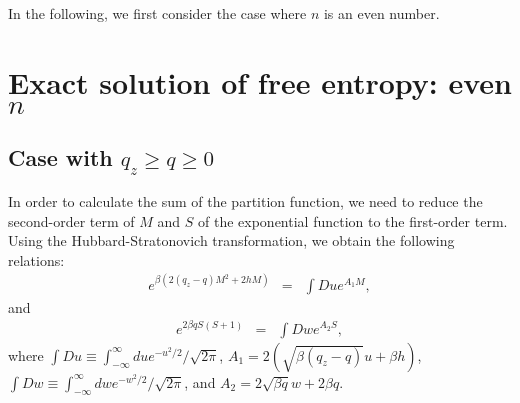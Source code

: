 \documentclass[
aps,
pre,
showpacs
]{revtex4-1}
\newcommand{\be}{\begin{eqnarray}}
\newcommand{\ee}{\end{eqnarray}}
\begin{document}
In the following, we first consider the case where $n$ is an even number.

\section{Exact solution of free entropy: even $n$}

\subsection{Case with $q_z\ge q \ge 0$}
In order to calculate the sum of the partition function, we need to reduce the second-order term of $M$ and $S$ of the exponential function to the first-order term.
Using the Hubbard-Stratonovich transformation, we obtain the following relations:
\be
e^{ \beta\left(   2(q_z-q) M^2+2 h M \right)}
&=&  \int Du e^{ A_1 M },
\ee
and
\be
e^{2\beta q S(S+1)} 
&=&\int Dw e^{ A_2 S}, \label{hubbst-S}
\ee
where $\int Du\equiv \int_{-\infty}^\infty du e^{-u^2/2}/ \sqrt{2\pi}$, $A_1= 2\left(\sqrt{\beta(q_z-q)} u+\beta h \right) $, $\int Dw\equiv \int_{-\infty}^\infty dw e^{-w^2/2}/ \sqrt{2\pi}$, and $A_2=2\sqrt{\beta q}w+ 2\beta q$.
\end{document}
